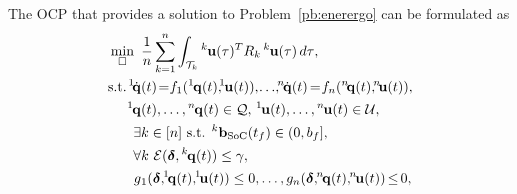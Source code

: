 \documentclass[letterpaper,10pt,conference,twoside]{IEEEtran}
\theoremstyle{definition}
\begin{document}
The OCP that provides a solution to Problem~\ref{pb:enerergo} can be formulated as
\begin{subequations}\label{eq:ocpfinal}\begin{align}
  \min_{\square}\,\,\,&{\frac{1}{n}\sum_{k=1}^{n}\int_{\mathcal{T}_k}{}^k\hspace*{-.1ex}\mathbf{u}(\tau)^TR_k\,{}^k\hspace*{-.1ex}\mathbf{u}(\tau)\,d\tau},\label{eq:ocpfinalcost}\\
  \text{\hspace*{.2ex}s.t.\hspace*{.3ex}}{}^1\hspace*{-.4ex}\dot{\mathbf{q}}&(t)\hspace*{-.4ex}=\hspace*{-.6ex}f_1({}^1\hspace*{-.2ex}\mathbf{q}(t),\hspace*{-.8ex}{}^1\hspace*{-.2ex}\mathbf{u}(t)),\hspace*{-.3ex}{\small\dots},\hspace*{-.7ex}{}^n\hspace*{-.3ex}\dot{\mathbf{q}}(t)\hspace*{-.3ex}=\hspace*{-.5ex}f_n({}^n\hspace*{-.4ex}\mathbf{q}(t),\hspace*{-.7ex}{}^n\hspace*{-.4ex}\mathbf{u}(t)),\\
  {}^1\hspace*{-.2ex}\mathbf{q}&(t),\dots,{}^n\hspace*{-.2ex}\mathbf{q}(t)\in\mathcal{Q},\,{}^1\hspace*{-.2ex}\mathbf{u}(t),\dots,{}^n\hspace*{-.2ex}\mathbf{u}(t)\in\mathcal{U},\\
  \exists &k\in[n]\text{ s.t. }{}^k\mathbf{b}_{\text{SoC}}(t_f)\in(0,b_f],\label{eq:battconst}\\
  \forall &k\,\,\mathcal{E}(\boldsymbol{\delta},{}^k\hspace*{-.2ex}\mathbf{q}(t))\leq\gamma,\label{eq:ergoconst}\\
  g&{}_1(\boldsymbol{\delta},\hspace*{-.6ex}{}^1\hspace*{-.3ex}\mathbf{q}(t),\hspace*{-.6ex}{}^1\hspace*{-.3ex}\mathbf{u}(t))\leq 0,\dots,g_n(\boldsymbol{\delta},\hspace*{-.6ex}{}^n\hspace*{-.3ex}\mathbf{q}(t),\hspace*{-.6ex}{}^n\hspace*{-.3ex}\mathbf{u}(t))\hspace*{-.3ex}\leq\hspace*{-.3ex}0,\label{eq:ocpfinalextra1}\\

\end{align}
\end{subequations}
\end{document}
